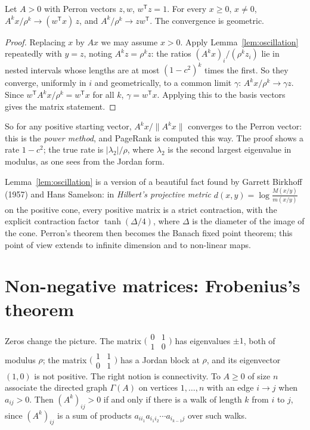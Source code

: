 \begin{theorem}\label{thm:powerconv}
Let $A>0$ with Perron vectors $z,w$, $w^{\mathsf T}z=1$. For every $x\ge0$, $x\ne0$, $A^kx/\rho^k\to(w^{\mathsf T}x)\,z$, and
$A^k/\rho^k\to zw^{\mathsf T}$. The convergence is geometric.
\end{theorem}
\begin{proof}
Replacing $x$ by $Ax$ we may assume $x>0$. Apply Lemma~\ref{lem:oscillation} repeatedly with $y=z$, noting $A^kz=\rho^kz$:
the ratios $(A^kx)_i/(\rho^kz_i)$ lie in nested intervals whose lengths are at most $(1-c^2)^k$ times the first. So they
converge, uniformly in $i$ and geometrically, to a common limit $\gamma$: $A^kx/\rho^k\to\gamma z$. Since $w^{\mathsf T}A^kx/
\rho^k=w^{\mathsf T}x$ for all $k$, $\gamma=w^{\mathsf T}x$. Applying this to the basis vectors gives the matrix statement.
\end{proof}

So for any positive starting vector, $A^kx/\|A^kx\|$ converges to the Perron vector: this is the \emph{power method}, and
PageRank is computed this way. The proof shows a rate $1-c^2$; the true rate is $|\lambda_2|/\rho$, where $\lambda_2$ is the
second largest eigenvalue in modulus, as one sees from the Jordan form.

\begin{remark}
Lemma~\ref{lem:oscillation} is a version of a beautiful fact found by Garrett Birkhoff (1957) and Hans Samelson: in
\emph{Hilbert's projective metric} $d(x,y)=\log\frac{M(x/y)}{m(x/y)}$ on the positive cone, every positive matrix is a strict
contraction, with the explicit contraction factor $\tanh(\Delta/4)$, where $\Delta$ is the diameter of the image of the cone.
Perron's theorem then becomes the Banach fixed point theorem; this point of view extends to infinite dimension and to
non-linear maps.
\end{remark}

\section{Non-negative matrices: Frobenius's theorem}

Zeros change the picture. The matrix $\bigl(\begin{smallmatrix}0&1\\1&0\end{smallmatrix}\bigr)$ has eigenvalues $\pm1$, both
of modulus $\rho$; the matrix $\bigl(\begin{smallmatrix}1&1\\0&1\end{smallmatrix}\bigr)$ has a Jordan block at $\rho$, and its
eigenvector $(1,0)$ is not positive. The right notion is connectivity. To $A\ge0$ of size $n$ associate the directed graph
$\Gamma(A)$ on vertices $1,\dots,n$ with an edge $i\to j$ when $a_{ij}>0$. Then $(A^k)_{ij}>0$ if and only if there is a walk of
length $k$ from $i$ to $j$, since $(A^k)_{ij}$ is a sum of products $a_{ii_1}a_{i_1i_2}\cdots a_{i_{k-1}j}$ over such walks.

